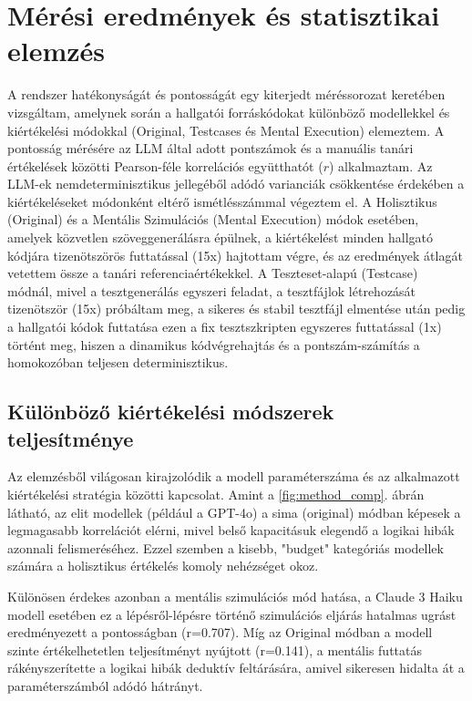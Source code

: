 \documentclass[12pt,a4paper]{article}
\begin{document}
\section{Mérési eredmények és statisztikai elemzés}
\label{sec:meresek}
A rendszer hatékonyságát és pontosságát egy kiterjedt méréssorozat keretében vizsgáltam, amelynek során a hallgatói forráskódokat különböző modellekkel és kiértékelési módokkal (Original, Testcases és Mental Execution) elemeztem. A pontosság mérésére az LLM által adott pontszámok és a manuális tanári értékelések közötti Pearson-féle korrelációs együtthatót ($r$) alkalmaztam. Az LLM-ek nemdeterminisztikus jellegéből adódó varianciák csökkentése érdekében a kiértékeléseket módonként eltérő ismétlésszámmal végeztem el. A Holisztikus (Original) és a Mentális Szimulációs (Mental Execution) módok esetében, amelyek közvetlen szöveggenerálásra épülnek, a kiértékelést minden hallgató kódjára tizenötszörös futtatással (15x) hajtottam végre, és az eredmények átlagát vetettem össze a tanári referenciaértékekkel. A Teszteset-alapú (Testcase) módnál, mivel a tesztgenerálás egyszeri feladat, a tesztfájlok létrehozását tizenötször (15x) próbáltam meg, a sikeres és stabil tesztfájl elmentése után pedig a hallgatói kódok futtatása ezen a fix tesztszkripten egyszeres futtatással (1x) történt meg, hiszen a dinamikus kódvégrehajtás és a pontszám-számítás a homokozóban teljesen determinisztikus.

\subsection{Különböző kiértékelési módszerek teljesítménye}
Az elemzésből világosan kirajzolódik a modell paraméterszáma és az alkalmazott kiértékelési stratégia közötti kapcsolat. Amint a \ref{fig:method_comp}. ábrán látható, az elit modellek (például a GPT-4o) a sima (original) módban képesek a legmagasabb korrelációt elérni, mivel belső kapacitásuk elegendő a logikai hibák azonnali felismeréséhez. Ezzel szemben a kisebb, "budget" kategóriás modellek számára a holisztikus értékelés komoly nehézséget okoz.

Különösen érdekes azonban a mentális szimulációs mód hatása, a Claude 3 Haiku modell esetében ez a lépésről-lépésre történő szimulációs eljárás hatalmas ugrást eredményezett a pontosságban (r=0.707). Míg az Original módban a modell szinte értékelhetetlen teljesítményt nyújtott (r=0.141), a mentális futtatás rákényszerítette a logikai hibák deduktív feltárására, amivel sikeresen hidalta át a paraméterszámból adódó hátrányt.
\end{document}
